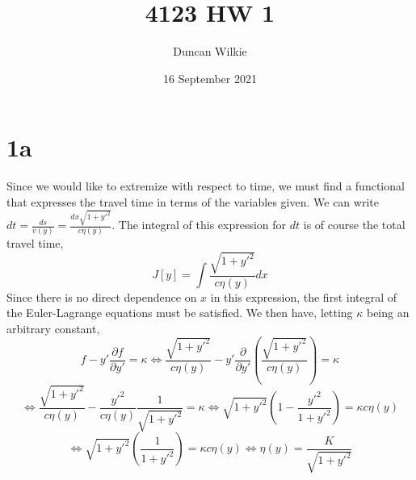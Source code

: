 \documentclass{article}
\title{4123 HW 1}
\author{Duncan Wilkie}
\date{16 September 2021}
\begin{document}
\maketitle

\section*{1a}
Since we would like to extremize with respect to time, we must find a functional that expresses the travel time in terms of the variables given.
We can write $dt = \frac{ds}{v(y)}=\frac{dx\sqrt{1+y'^2}}{c\eta(y)}$.
The integral of this expression for $dt$ is of course the total travel time,\[J[y]  = \int\frac{\sqrt{1+y'^2}}{c\eta(y)}dx\]
Since there is no direct dependence on $x$ in this expression, the first integral of the Euler-Lagrange equations must be satisfied.
We then have, letting $\kappa$ being an arbitrary constant,
\[f-y'\frac{\partial f}{\partial y'} = \kappa\Leftrightarrow \frac{\sqrt{1+y'^2}}{c\eta(y)}-y'\frac{\partial}{\partial y'}\left(\frac{\sqrt{1+y'^2}}{c\eta(y)}\right) = \kappa\]
\[\Leftrightarrow \frac{\sqrt{1+y'^2}}{c\eta(y)}-\frac{y'^2}{c\eta(y)}\frac{1}{\sqrt{1+y'^2}}=\kappa\Leftrightarrow\sqrt{1+y'^2}\left(1-\frac{y'^2}{1+y'^2}\right)=\kappa c\eta(y)\]
\[\Leftrightarrow\sqrt{1+y'^2}\left(\frac{1}{1+y'^2}\right)=\kappa c\eta(y)\Leftrightarrow\eta(y)=\frac{K}{\sqrt{1+y'^2}}\]
\end{document}
